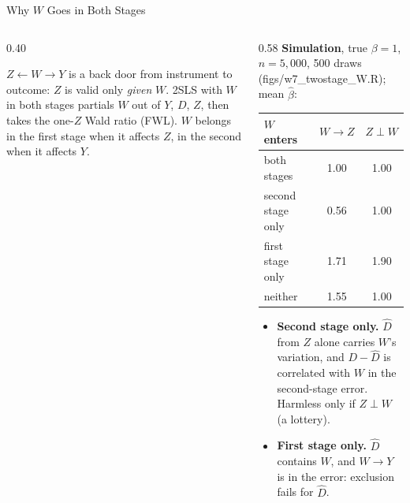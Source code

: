 \documentclass[aspectratio=169,11pt,xcolor=dvipsnames]{beamer}
\newcommand{\srcp}[1]{{\scriptsize\color{gray}(#1)}}
\begin{document}
\begin{frame}{Why $W$ Goes in Both Stages}
\begin{columns}[T]
\begin{column}{0.40\textwidth}
\begin{center}
\end{center}
\vskip-6pt
\small
$Z \leftarrow W \rightarrow Y$ is a back door from instrument to outcome:
$Z$ is valid only \emph{given} $W$. 2SLS with $W$ in both stages partials $W$
out of $Y$, $D$, $Z$, then takes the one-$Z$ Wald ratio (FWL). $W$ belongs in
the first stage when it affects $Z$, in the second when it affects $Y$.
\end{column}
\begin{column}{0.58\textwidth}
\small
\textbf{Simulation}, true $\beta = 1$, $n = 5{,}000$, 500 draws
\srcp{figs/w7\_twostage\_W.R}; mean $\hat\beta$:
\vskip-4pt
\begin{center}\footnotesize
\renewcommand{\arraystretch}{1.0}
\begin{tabular}{@{}lcc@{}}
\toprule
$W$ enters & $W \to Z$ & $Z \perp W$ \\
\midrule
both stages & 1.00 & 1.00 \\
second stage only & \alert{0.56} & 1.00 \\
first stage only & \alert{1.71} & \alert{1.90} \\
neither & \alert{1.55} & 1.00 \\
\bottomrule
\end{tabular}
\end{center}
\vskip-4pt
\begin{itemize}\itemsep0pt
  \item \textbf{Second stage only.} $\hat D$ from $Z$ alone carries $W$'s
        variation, and $D - \hat D$ is correlated with $W$ in the second-stage
        error. Harmless only if $Z \perp W$ (a lottery).
  \item \textbf{First stage only.} $\hat D$ contains $W$, and $W \to Y$ is
        in the error: exclusion fails for $\hat D$.
\end{itemize}
\end{column}
\end{columns}
\end{frame}
\end{document}
